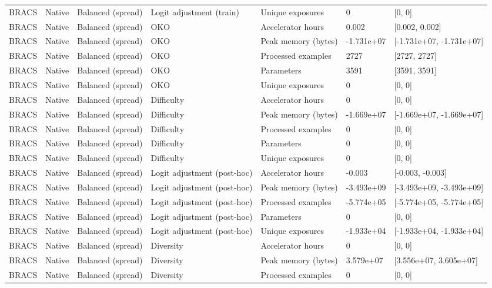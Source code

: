 \begin{longtable}{lllllll}
BRACS & Native & Balanced (spread) & Logit adjustment (train) & Unique exposures & 0 & [0, 0] \\
BRACS & Native & Balanced (spread) & OKO & Accelerator hours & 0.002 & [0.002, 0.002] \\
BRACS & Native & Balanced (spread) & OKO & Peak memory (bytes) & -1.731e+07 & [-1.731e+07, -1.731e+07] \\
BRACS & Native & Balanced (spread) & OKO & Processed examples & 2727 & [2727, 2727] \\
BRACS & Native & Balanced (spread) & OKO & Parameters & 3591 & [3591, 3591] \\
BRACS & Native & Balanced (spread) & OKO & Unique exposures & 0 & [0, 0] \\
BRACS & Native & Balanced (spread) & Difficulty & Accelerator hours & 0 & [0, 0] \\
BRACS & Native & Balanced (spread) & Difficulty & Peak memory (bytes) & -1.669e+07 & [-1.669e+07, -1.669e+07] \\
BRACS & Native & Balanced (spread) & Difficulty & Processed examples & 0 & [0, 0] \\
BRACS & Native & Balanced (spread) & Difficulty & Parameters & 0 & [0, 0] \\
BRACS & Native & Balanced (spread) & Difficulty & Unique exposures & 0 & [0, 0] \\
BRACS & Native & Balanced (spread) & Logit adjustment (post-hoc) & Accelerator hours & -0.003 & [-0.003, -0.003] \\
BRACS & Native & Balanced (spread) & Logit adjustment (post-hoc) & Peak memory (bytes) & -3.493e+09 & [-3.493e+09, -3.493e+09] \\
BRACS & Native & Balanced (spread) & Logit adjustment (post-hoc) & Processed examples & -5.774e+05 & [-5.774e+05, -5.774e+05] \\
BRACS & Native & Balanced (spread) & Logit adjustment (post-hoc) & Parameters & 0 & [0, 0] \\
BRACS & Native & Balanced (spread) & Logit adjustment (post-hoc) & Unique exposures & -1.933e+04 & [-1.933e+04, -1.933e+04] \\
BRACS & Native & Balanced (spread) & Diversity & Accelerator hours & 0 & [0, 0] \\
BRACS & Native & Balanced (spread) & Diversity & Peak memory (bytes) & 3.579e+07 & [3.556e+07, 3.605e+07] \\
BRACS & Native & Balanced (spread) & Diversity & Processed examples & 0 & [0, 0] \\

\end{longtable}
